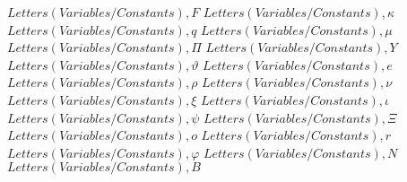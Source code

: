 \documentclass{article}
\begin{document}
$Letters (Variables/Constants),F$
\linebreak
\linebreak
$Letters (Variables/Constants),\kappa$
\linebreak
\linebreak
$Letters (Variables/Constants),q$
\linebreak
\linebreak
$Letters (Variables/Constants),\mu$
\linebreak
\linebreak
$Letters (Variables/Constants),\Pi$
\linebreak
\linebreak
$Letters (Variables/Constants),Y$
\linebreak
\linebreak
$Letters (Variables/Constants),\vartheta$
\linebreak
\linebreak
$Letters (Variables/Constants),e$
\linebreak
\linebreak
$Letters (Variables/Constants),\rho$
\linebreak
\linebreak
$Letters (Variables/Constants),\nu$
\linebreak
\linebreak
$Letters (Variables/Constants),\xi$
\linebreak
\linebreak
$Letters (Variables/Constants),\iota$
\linebreak
\linebreak
$Letters (Variables/Constants),\psi$
\linebreak
\linebreak
$Letters (Variables/Constants),\Xi$
\linebreak
\linebreak
$Letters (Variables/Constants),o$
\linebreak
\linebreak
$Letters (Variables/Constants),r$
\linebreak
\linebreak
$Letters (Variables/Constants),\varphi$
\linebreak
\linebreak
$Letters (Variables/Constants),N$
\linebreak
\linebreak
$Letters (Variables/Constants),B$
\linebreak
\linebreak
\end{document}
